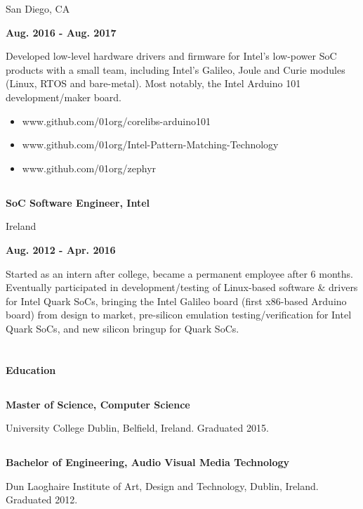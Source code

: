 \documentclass[6pt]{article}
\begin{document}
\begin{minipage}{35em}
\begin{minipage}{20em}
{San Diego, CA}
\end{minipage}
\hfill
\begin{minipage}{12em}
{\bfseries Aug. 2016 - Aug. 2017}
\end{minipage}
\break

Developed low-level hardware drivers and firmware for Intel's low-power SoC products
with a small team, including Intel's Galileo, Joule and Curie modules (Linux, RTOS and
bare-metal). Most notably, the Intel Arduino 101 development/maker board.
\begin{itemize}
    \item www.github.com/01org/corelibs-arduino101
    \item www.github.com/01org/Intel-Pattern-Matching-Technology
    \item www.github.com/01org/zephyr
\end{itemize}
\dotfill

%
%
\subsection*{}
\begin{minipage}{20em}
{\bfseries SoC Software Engineer, Intel

Ireland}

\end{minipage}
\hfill
\begin{minipage}{12em}
{\bfseries \hfill Aug. 2012 - Apr. 2016}
\end{minipage}
\break

Started as an intern after college, became a permanent employee after 6 months. Eventually
participated in development/testing of Linux-based software \& drivers for Intel Quark SoCs,
bringing the Intel Galileo board (first x86-based Arduino board) from design to market,
pre-silicon emulation testing/verification for Intel Quark SoCs, and new silicon bringup for Quark SoCs.

\section*{}
{\Large \bfseries Education}

\dotfill
\subsection*{}
{\bfseries Master of Science, Computer Science}

University College Dublin, Belfield, Ireland. Graduated 2015.
\subsection*{}
{\bfseries Bachelor of Engineering, Audio Visual Media Technology}

Dun Laoghaire Institute of Art, Design and Technology, Dublin, Ireland. Graduated 2012.

\end{minipage}
\end{document}
